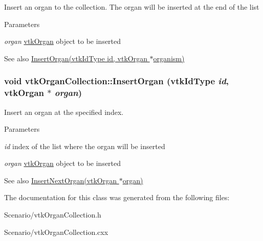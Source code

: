 Insert an organ to the collection. The organ will be inserted at the end of the list 
\begin{DoxyParams}{Parameters}
\item[{\em organ}]\hyperlink{classvtkOrgan}{vtkOrgan} object to be inserted \end{DoxyParams}
\begin{DoxySeeAlso}{See also}
\hyperlink{classvtkOrganCollection_ab477eb49fdffaa1d077634f9b547fa35}{InsertOrgan(vtkIdType id, vtkOrgan $\ast$organism)} 
\end{DoxySeeAlso}
\hypertarget{classvtkOrganCollection_ab477eb49fdffaa1d077634f9b547fa35}{
\subsubsection[{InsertOrgan}]{\setlength{\rightskip}{0pt plus 5cm}void vtkOrganCollection::InsertOrgan (vtkIdType {\em id}, \/  {\bf vtkOrgan} $\ast$ {\em organ})}}
\label{classvtkOrganCollection_ab477eb49fdffaa1d077634f9b547fa35}


Insert an organ at the specified index. 
\begin{DoxyParams}{Parameters}
\item[{\em id}]index of the list where the organ will be inserted \item[{\em organ}]\hyperlink{classvtkOrgan}{vtkOrgan} object to be inserted \end{DoxyParams}
\begin{DoxySeeAlso}{See also}
\hyperlink{classvtkOrganCollection_abf0d197e67a3d97b38b35a149585a361}{InsertNextOrgan(vtkOrgan $\ast$organ)} 
\end{DoxySeeAlso}


The documentation for this class was generated from the following files:\begin{DoxyCompactItemize}
\item 
Scenario/vtkOrganCollection.h\item 
Scenario/vtkOrganCollection.cxx\end{DoxyCompactItemize}
